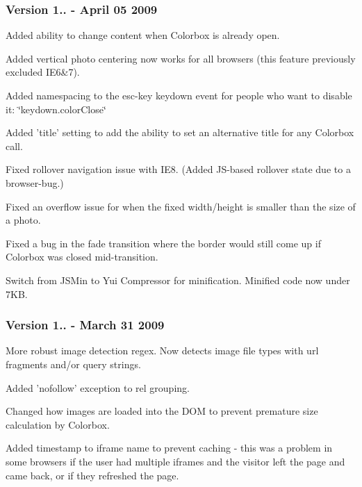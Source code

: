 \subsubsection*{Version 1.. -\/ April 05 2009}


\begin{DoxyItemize}
\item Added ability to change content when Colorbox is already open.
\item Added vertical photo centering now works for all browsers (this feature previously excluded I\-E6\&7).
\item Added namespacing to the esc-\/key keydown event for people who want to disable it\-: \char`\"{}keydown.\-color\-Close\char`\"{}
\item Added 'title' setting to add the ability to set an alternative title for any Colorbox call.
\item Fixed rollover navigation issue with I\-E8. (Added J\-S-\/based rollover state due to a browser-\/bug.)
\item Fixed an overflow issue for when the fixed width/height is smaller than the size of a photo.
\item Fixed a bug in the fade transition where the border would still come up if Colorbox was closed mid-\/transition.
\item Switch from J\-S\-Min to Yui Compressor for minification. Minified code now under 7\-K\-B.
\end{DoxyItemize}

\subsubsection*{Version 1.. -\/ March 31 2009}


\begin{DoxyItemize}
\item More robust image detection regex. Now detects image file types with url fragments and/or query strings.
\item Added 'nofollow' exception to rel grouping.
\item Changed how images are loaded into the D\-O\-M to prevent premature size calculation by Colorbox.
\item Added timestamp to iframe name to prevent caching -\/ this was a problem in some browsers if the user had multiple iframes and the visitor left the page and came back, or if they refreshed the page.
\end{DoxyItemize}

